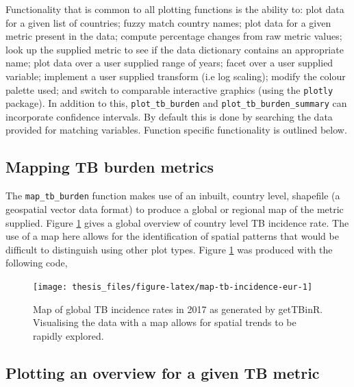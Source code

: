 \documentclass[11pt,twoside]{bristolthesis}
\begin{document}
  Functionality that is common to all plotting functions is the ability to: plot data for a given list of countries; fuzzy match country names; plot data for a given metric present in the data; compute percentage changes from raw metric values; look up the supplied metric to see if the data dictionary contains an appropriate name; plot data over a user supplied range of years; facet over a user supplied variable; implement a user supplied transform (i.e log scaling); modify the colour palette used; and switch to comparable interactive graphics (using the \texttt{plotly} package). In addition to this, \texttt{plot\_tb\_burden} and \texttt{plot\_tb\_burden\_summary} can incorporate confidence intervals. By default this is done by searching the data provided for matching variables. Function specific functionality is outlined below.
  
  \hypertarget{mapping-tb-burden-metrics}{%
  \subsection{Mapping TB burden metrics}\label{mapping-tb-burden-metrics}}
  
  The \texttt{map\_tb\_burden} function makes use of an inbuilt, country level, shapefile (a geospatial vector data format) to produce a global or regional map of the metric supplied. Figure \ref{fig:map-tb-incidence-eur} gives a global overview of country level TB incidence rate. The use of a map here allows for the identification of spatial patterns that would be difficult to distinguish using other plot types. Figure \ref{fig:map-tb-incidence-eur} was produced with the following code,
  \begin{Shaded}
  \begin{Highlighting}[]
  \NormalTok{(} \NormalTok{, } \NormalTok{)}
  \end{Highlighting}
  \end{Shaded}
  \begin{figure}
  
  {\centering \texttt{[image: thesis\_files/figure-latex/map-tb-incidence-eur-1]} 
  
  }
  
  \caption[Map of global TB incidence rates in 2017 as generated by getTBinR.]{Map of global TB incidence rates in 2017 as generated by getTBinR. Visualising the data with a map allows for spatial trends to be rapidly explored.}\label{fig:map-tb-incidence-eur}
  \end{figure}
  \hypertarget{plotting-an-overview-for-a-given-tb-metric}{%
  \subsection{Plotting an overview for a given TB metric}\label{plotting-an-overview-for-a-given-tb-metric}}
  
\end{document}

